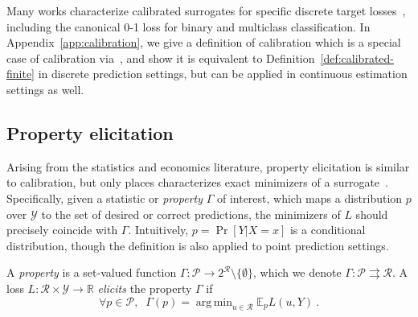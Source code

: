 \documentclass[anon,12pt]{colt2021} %
\newcommand{\Comments}{1}
\newcommand{\mytodo}[2]{\ifnum\Comments=1%
	\todo[linecolor=#1!80!black,backgroundcolor=#1,bordercolor=#1!80!black]{#2}\fi}
\newcommand{\jessiet}[1]{\mytodo{purple!20!white}{JF: #1}}
\newcommand{\reals}{\mathbb{R}}
\newcommand{\E}{\mathbb{E}}
\newcommand{\R}{\mathcal{R}}
\renewcommand{\P}{\mathcal{P}}
\newcommand{\Y}{\mathcal{Y}}
\newcommand{\exploss}[3]{\E_{#3} #1(#2,Y)}
\newcommand{\toto}{\rightrightarrows}
\DeclareMathOperator*{\argmin}{arg\,min}
\begin{document}
Many works characterize calibrated surrogates for specific discrete target losses~\citep{zhang2004statistical,lin2004note,bartlett2006convexity,tewari2007consistency}, including the canonical 0-1 loss for binary and multiclass classification.
In Appendix~\ref{app:calibration}, we give a definition of calibration which is a special case of calibration via~\citet{steinwart2008support}, and show it is equivalent to Definition~\ref{def:calibrated-finite} in discrete prediction settings, but can be applied in continuous estimation settings as well.


\subsection{Property elicitation}\label{subsec:properties}
Arising from the statistics and economics literature, property elicitation is similar to calibration, but only places characterizes exact minimizers of a surrogate~\citep{savage1971elicitation,osband1985information-eliciting,lambert2008eliciting,lambert2009eliciting,lambert2018elicitation,frongillo2015vector-valued,frongillo2014general}.
Specifically, given a statistic or \emph{property} $\Gamma$ of interest, which maps a distribution $p$ over $\Y$ to the set of desired or correct predictions, the minimizers of $L$ should precisely coincide with $\Gamma$.
Intuitively, $p = \Pr[Y|X=x]$ is a conditional distribution, though the definition is also applied to point prediction settings.

\begin{definition}
	A \emph{property} is a set-valued function $\Gamma : \P \to 2^\R \setminus \{\emptyset\}$, which we denote $\Gamma: \P \toto \R$.
	A loss $L : \R \times \Y \to \reals$ \emph{elicits} the property $\Gamma$ if
	\begin{equation}
    \label{eq:elic}    
    \forall p \in \P, \;\; \Gamma(p) = \argmin_{u \in \R} \exploss{L}{u}{p}~.
	\end{equation}
\end{definition}
\end{document}
